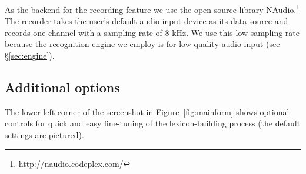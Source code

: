 \documentclass[11pt]{article}
\begin{document}
As the backend for the recording feature we use the open-source library NAudio.\footnote{\url{http://naudio.codeplex.com/}}
The recorder takes the user's default audio input device as its data source and records one channel with a sampling rate of 8 kHz. 
We use this low sampling rate because the recognition engine we employ is for low-quality audio input (see \S\ref{sec:engine}).





\subsection{Additional options}
\label{sec:options}

The lower left corner of the screenshot in Figure~\ref{fig:mainform} shows 
optional controls for quick and easy fine-tuning of the lexicon-building process (the default settings are pictured).
\end{document}

